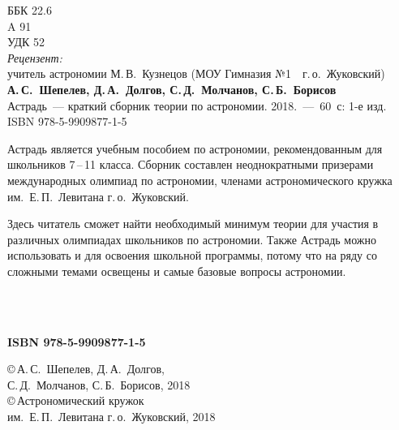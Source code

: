 \clearpage
\setcounter{page}{2}
\thispagestyle{empty}
	ББК 22.6\\
	\hspace*{1.8pc} A 91\\
	УДК 52\\[1pc]

{\small {\itshape Рецензент:}\\ учитель астрономии М.\,В.~Кузнецов (МОУ Гимназия №1~~г.\,о.~Жуковский)}\\[2pc]

{\hspace{1pc} {\bfseries А.\,С.~Шепелев, Д.\,А.~Долгов, С.\,Д.~Молчанов, С.\,Б.~Борисов}\\ Астрадь~--- краткий сборник теории по астрономии. 2018.~---~60~с: 1-е изд.}\\ 
ISBN 978-5-9909877-1-5\\[3pc]

\hspace{1pc} {\small Астрадь является учебным пособием по астрономии, рекомендованным для школьников 7\,--\,11 класса. Сборник составлен неоднократными призерами международных олимпиад по астрономии, членами астрономического кружка им.~Е.\,П.~Левитана г.\,о.~Жуковский. 

\hspace{1pc} Здесь читатель сможет найти необходимый минимум теории для участия в различных олимпиадах школьников по астрономии. Также Астрадь можно использовать и для освоения школьной программы, потому что на ряду со сложными темами освещены и самые базовые вопросы астрономии.}\\[3pc]

\\[5pc]


\begin{minipage}[t]{0.4\tw}
	{\bfseries ISBN 978-5-9909877-1-5}
\end{minipage}
\hfill
\begin{minipage}[t]{0.57\tw}
	\small
	\copyright\,А.\,С.~Шепелев, Д.\,А.~Долгов,\\
	 \hspace*{8pt} С.\,Д.~Молчанов, С.\,Б.~Борисов, 2018\\[3pt]
	\copyright\,Астрономический кружок\\ \hspace*{8pt} им.~Е.\,П.~Левитана г.\,о.~Жуковский, 2018
\end{minipage}
\newpage